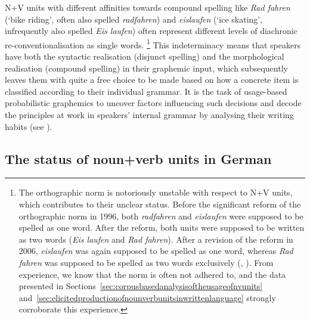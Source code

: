 \documentclass[biblatex, charis, linguex]{glossa}\usepackage{knitr}
\begin{document}
N+V units with different affinities towards compound spelling like \textit{Rad fahren} (`bike riding', often also spelled \textit{radfahren}) and \textit{eislaufen} (`ice skating', infrequently also spelled \textit{Eis laufen}) often represent different levels of diachronic re-conventionalisation as single words.%
\footnote{The orthographic norm is notoriously unstable with respect to N+V units, which contributes to their unclear status.
Before the significant reform of the orthographic norm in 1996, both \textit{radfahren} and \textit{eislaufen} were supposed to be spelled as one word.
After the reform, both units were supposed to be written as two words (\textit{Eis laufen} and \textit{Rad fahren}).
After a revision of the reform in 2006, \textit{eislaufen} was again supposed to be spelled as one word, whereas \textit{Rad fahren} was supposed to be spelled as two words exclusively (\citealt[32]{Primus2010}, \citealt[356]{Eisenberg2020a}).
From experience, we know that the norm is often not adhered to, and the data presented in Sections~\ref{sec:corpusbasedanalysisoftheusageofnvunits} and~\ref{sec:elicitedproductionofnounverbunitsinwrittenlanguage} strongly corroborate this experience.}
This indeterminacy means that speakers have both the syntactic realisation (disjunct spelling) and the morphological realisation (compound spelling) in their graphemic input, which subsequently leaves them with quite a free choice to be made based on how a concrete item is classified according to their individual grammar.
It is the task of usage-based probabilistic graphemics to uncover factors influencing such decisions and decode the principles at work in speakers' internal grammar by analysing their writing habits (see \citealt{SchaeferSayatz2016}).


\subsection{The status of noun+verb units in German}
\label{sec:thestatusofnounverbunitsingerman}
\end{document}
